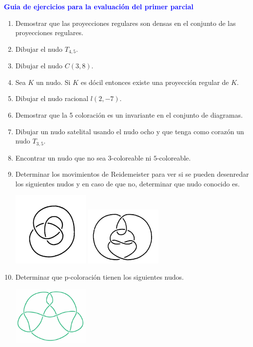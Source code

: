 \documentclass[12pts]{report}
\begin{document}
\begin{center}
\textcolor{blue}{\textbf{\large Guia de ejercicios para la evaluación del primer parcial}}
\end{center}

\begin{enumerate}
\item Demostrar que las proyecciones regulares son densas en el conjunto de las proyecciones regulares.
\item Dibujar el nudo $T_{4,5}$.
\item Dibujar el nudo $C(3,8)$.
\item Sea $K$ un nudo. Si $K$ es dócil entonces existe una proyección regular de $K$.
\item Dibujar el nudo racional $l(2,-7)$.
\item Demostrar que la 5 coloración es un invariante en el conjunto de diagramas.
\item Dibujar un nudo satelital  usando el nudo  ocho y que tenga como corazón un nudo $T_{3, 5}$.
\item Encontrar un nudo que no sea $3$-coloreable ni $5$-coloreable.
\item Determinar los movimientos de Reidemeister para ver si se pueden desenredar los siguientes nudos y en caso de que no, determinar que nudo conocido es.
\begin{center}
\includegraphics[width=0.3\textwidth] {trebol.png}\quad
\includegraphics[width=0.3\textwidth]{desenredar.png}
\end{center}
\item Determinar que p-coloración tienen los siguientes nudos.
\begin{center}
\includegraphics[width=0.3\textwidth] {diagrama1.png}\quad 

\end{center}
\end{enumerate}
\end{document}
